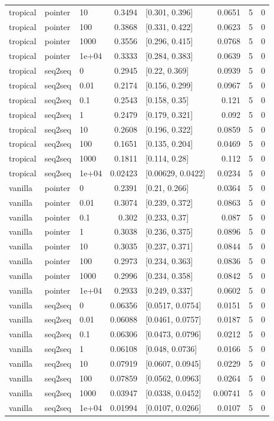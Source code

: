 \documentclass[10pt]{article}
\begin{document}
{\begin{longtable}{lllrlrrr}
tropical & pointer & 10 & 0.3494 & [0.301, 0.396] & 0.0651 & 5 & 0\\
tropical & pointer & 100 & 0.3868 & [0.331, 0.422] & 0.0623 & 5 & 0\\
tropical & pointer & 1000 & 0.3556 & [0.296, 0.415] & 0.0768 & 5 & 0\\
tropical & pointer & 1e+04 & 0.3333 & [0.284, 0.383] & 0.0639 & 5 & 0\\
tropical & seq2seq & 0 & 0.2945 & [0.22, 0.369] & 0.0939 & 5 & 0\\
tropical & seq2seq & 0.01 & 0.2174 & [0.156, 0.299] & 0.0967 & 5 & 0\\
tropical & seq2seq & 0.1 & 0.2543 & [0.158, 0.35] & 0.121 & 5 & 0\\
tropical & seq2seq & 1 & 0.2479 & [0.179, 0.321] & 0.092 & 5 & 0\\
tropical & seq2seq & 10 & 0.2608 & [0.196, 0.322] & 0.0859 & 5 & 0\\
tropical & seq2seq & 100 & 0.1651 & [0.135, 0.204] & 0.0469 & 5 & 0\\
tropical & seq2seq & 1000 & 0.1811 & [0.114, 0.28] & 0.112 & 5 & 0\\
tropical & seq2seq & 1e+04 & 0.02423 & [0.00629, 0.0422] & 0.0234 & 5 & 0\\
vanilla & pointer & 0 & 0.2391 & [0.21, 0.266] & 0.0364 & 5 & 0\\
vanilla & pointer & 0.01 & 0.3074 & [0.239, 0.372] & 0.0863 & 5 & 0\\
vanilla & pointer & 0.1 & 0.302 & [0.233, 0.37] & 0.087 & 5 & 0\\
vanilla & pointer & 1 & 0.3038 & [0.236, 0.375] & 0.0896 & 5 & 0\\
vanilla & pointer & 10 & 0.3035 & [0.237, 0.371] & 0.0844 & 5 & 0\\
vanilla & pointer & 100 & 0.2973 & [0.234, 0.363] & 0.0836 & 5 & 0\\
vanilla & pointer & 1000 & 0.2996 & [0.234, 0.358] & 0.0842 & 5 & 0\\
vanilla & pointer & 1e+04 & 0.2933 & [0.249, 0.337] & 0.0602 & 5 & 0\\
vanilla & seq2seq & 0 & 0.06356 & [0.0517, 0.0754] & 0.0151 & 5 & 0\\
vanilla & seq2seq & 0.01 & 0.06088 & [0.0461, 0.0757] & 0.0187 & 5 & 0\\
vanilla & seq2seq & 0.1 & 0.06306 & [0.0473, 0.0796] & 0.0212 & 5 & 0\\
vanilla & seq2seq & 1 & 0.06108 & [0.048, 0.0736] & 0.0166 & 5 & 0\\
vanilla & seq2seq & 10 & 0.07919 & [0.0607, 0.0945] & 0.0229 & 5 & 0\\
vanilla & seq2seq & 100 & 0.07859 & [0.0562, 0.0963] & 0.0264 & 5 & 0\\
vanilla & seq2seq & 1000 & 0.03947 & [0.0338, 0.0452] & 0.00741 & 5 & 0\\
vanilla & seq2seq & 1e+04 & 0.01994 & [0.0107, 0.0266] & 0.0107 & 5 & 0\\
\bottomrule
\end{longtable}
}
\end{document}
